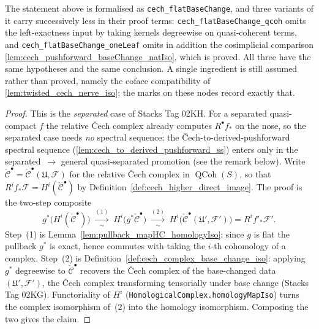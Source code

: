 \begin{remark}
  \label{rem:cech_flat_base_change_state}
  The statement above is formalised as \texttt{cech\_flatBaseChange}, and three variants of it
  carry successively less in their proof terms: \texttt{cech\_flatBaseChange\_qcoh} omits the
  left-exactness input by taking kernels degreewise on quasi-coherent terms, and
  \texttt{cech\_flatBaseChange\_oneLeaf} omits in addition the cosimplicial comparison
  \cref{lem:cech_pushforward_baseChange_natIso}, which is proved. All three have the same
  hypotheses and the same conclusion. A single ingredient is still assumed rather than proved,
  namely the coface compatibility of \cref{lem:twisted_cech_nerve_iso}; the marks on these nodes
  record exactly that.
\end{remark}

\begin{proof}
  This is the \emph{separated} case of Stacks Tag 02KH. For a separated quasi-compact
  \(f\) the relative {\v C}ech complex already computes \(R^\bullet f_*\) on the nose,
  so the separated case needs \emph{no} spectral sequence; the
  {\v C}ech-to-derived-pushforward spectral sequence
  (\cref{lem:cech_to_derived_pushforward_ss}) enters only in the
  separated~\(\to\) general quasi-separated promotion (see the remark below). Write
  \(\check{\mathcal{C}}^\bullet = \check{\mathcal{C}}^\bullet(\mathfrak{U},\mathcal{F})\)
  for the relative {\v C}ech complex in \(\operatorname{QCoh}(S)\), so that
  \(R^i f_*\mathcal{F} = H^i(\check{\mathcal{C}}^\bullet)\) by
  Definition~\ref{def:cech_higher_direct_image}. The proof is the two-step composite
  \[
    g^*\bigl(H^i(\check{\mathcal{C}}^\bullet)\bigr)
      \;\xrightarrow[\ \sim\ ]{(1)}\;
    H^i\bigl(g^*\check{\mathcal{C}}^\bullet\bigr)
      \;\xrightarrow[\ \sim\ ]{(2)}\;
    H^i\bigl(\check{\mathcal{C}}^\bullet(\mathfrak{U}', \mathcal{F}')\bigr)
      = R^i f'_*\mathcal{F}'.
  \]
  Step~(1) is Lemma~\ref{lem:pullback_mapHC_homologyIso}: since \(g\) is flat the
  pullback \(g^*\) is exact, hence commutes with taking the \(i\)-th cohomology of a
  complex. Step~(2) is Definition~\ref{def:cech_complex_base_change_iso}: applying
  \(g^*\) degreewise to \(\check{\mathcal{C}}^\bullet\) recovers the {\v C}ech complex
  of the base-changed data \((\mathfrak{U}', \mathcal{F}')\), the {\v C}ech complex
  transforming tensorially under base change (Stacks Tag 02KG). Functoriality of
  \(H^i\) (\texttt{HomologicalComplex.homologyMapIso}) turns the complex isomorphism
  of~(2) into the homology isomorphism. Composing the two gives the claim.
\end{proof}

